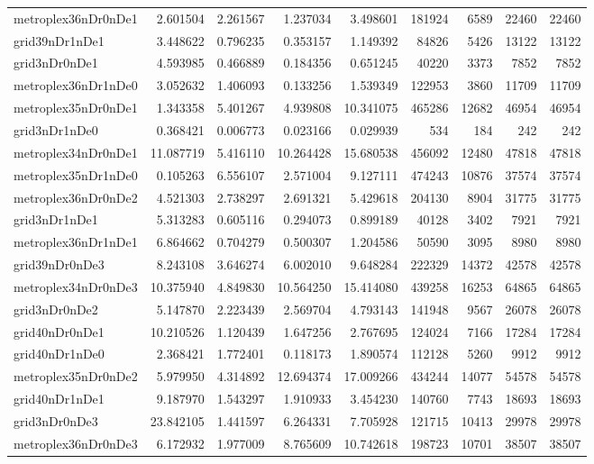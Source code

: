 \begin{longtable}{|l|r|r|r|r|r|r|r|r|}
metroplex36nDr0nDe1 & 2.601504 & 2.261567 & 1.237034 & 3.498601 & 181924 & 6589 & 22460 & 22460 \\
grid39nDr1nDe1 & 3.448622 & 0.796235 & 0.353157 & 1.149392 & 84826 & 5426 & 13122 & 13122 \\
grid3nDr0nDe1 & 4.593985 & 0.466889 & 0.184356 & 0.651245 & 40220 & 3373 & 7852 & 7852 \\
metroplex36nDr1nDe0 & 3.052632 & 1.406093 & 0.133256 & 1.539349 & 122953 & 3860 & 11709 & 11709 \\
metroplex35nDr0nDe1 & 1.343358 & 5.401267 & 4.939808 & 10.341075 & 465286 & 12682 & 46954 & 46954 \\
grid3nDr1nDe0 & 0.368421 & 0.006773 & 0.023166 & 0.029939 & 534 & 184 & 242 & 242 \\
metroplex34nDr0nDe1 & 11.087719 & 5.416110 & 10.264428 & 15.680538 & 456092 & 12480 & 47818 & 47818 \\
metroplex35nDr1nDe0 & 0.105263 & 6.556107 & 2.571004 & 9.127111 & 474243 & 10876 & 37574 & 37574 \\
metroplex36nDr0nDe2 & 4.521303 & 2.738297 & 2.691321 & 5.429618 & 204130 & 8904 & 31775 & 31775 \\
grid3nDr1nDe1 & 5.313283 & 0.605116 & 0.294073 & 0.899189 & 40128 & 3402 & 7921 & 7921 \\
metroplex36nDr1nDe1 & 6.864662 & 0.704279 & 0.500307 & 1.204586 & 50590 & 3095 & 8980 & 8980 \\
grid39nDr0nDe3 & 8.243108 & 3.646274 & 6.002010 & 9.648284 & 222329 & 14372 & 42578 & 42578 \\
metroplex34nDr0nDe3 & 10.375940 & 4.849830 & 10.564250 & 15.414080 & 439258 & 16253 & 64865 & 64865 \\
grid3nDr0nDe2 & 5.147870 & 2.223439 & 2.569704 & 4.793143 & 141948 & 9567 & 26078 & 26078 \\
grid40nDr0nDe1 & 10.210526 & 1.120439 & 1.647256 & 2.767695 & 124024 & 7166 & 17284 & 17284 \\
grid40nDr1nDe0 & 2.368421 & 1.772401 & 0.118173 & 1.890574 & 112128 & 5260 & 9912 & 9912 \\
metroplex35nDr0nDe2 & 5.979950 & 4.314892 & 12.694374 & 17.009266 & 434244 & 14077 & 54578 & 54578 \\
grid40nDr1nDe1 & 9.187970 & 1.543297 & 1.910933 & 3.454230 & 140760 & 7743 & 18693 & 18693 \\
grid3nDr0nDe3 & 23.842105 & 1.441597 & 6.264331 & 7.705928 & 121715 & 10413 & 29978 & 29978 \\
metroplex36nDr0nDe3 & 6.172932 & 1.977009 & 8.765609 & 10.742618 & 198723 & 10701 & 38507 & 38507 \\

\end{longtable}
